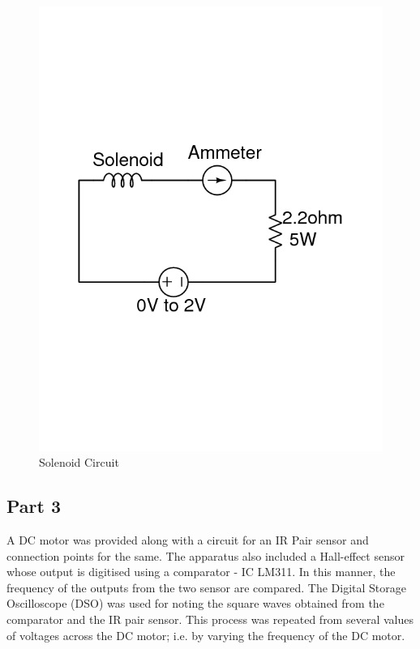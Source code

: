\documentclass[12pt]{article}
\begin{document}
\begin{figure}[H]
	\centering
	\includegraphics[width = 0.6\linewidth, trim = {0 8.5cm 0 8.5cm}, clip]{Solenoid_Circuit.png}
	\caption{Solenoid Circuit}
\end{figure}

\subsection{Part 3}

A DC motor was provided along with a circuit for an IR Pair sensor and connection points for the same. The apparatus also included a Hall-effect sensor whose output is digitised using a comparator - IC LM311. In this manner, the frequency of the outputs from the two sensor are compared. The Digital Storage Oscilloscope (DSO) was used for noting the square waves obtained from the comparator and the IR pair sensor. This process was repeated from several values of voltages across the DC motor; i.e. by varying the frequency of the DC motor.
\end{document}
